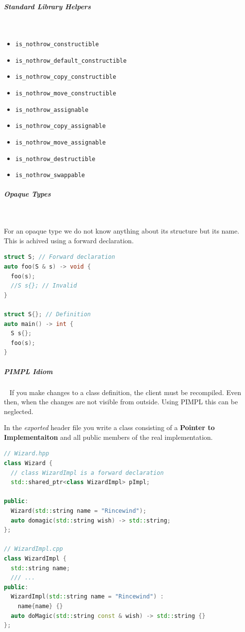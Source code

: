 \documentclass[11pt,twoside,landscape]{article}
\begin{document}
\begin{multicols}{2}
\subparagraph{Standard Library Helpers} \
\label{sec:org117503f}
\begin{itemize}
\item \texttt{is\_nothrow\_constructible}
\item \texttt{is\_nothrow\_default\_constructible}
\item \texttt{is\_nothrow\_copy\_constructible}
\item \texttt{is\_nothrow\_move\_constructible}
\item \texttt{is\_nothrow\_assignable}
\item \texttt{is\_nothrow\_copy\_assignable}
\item \texttt{is\_nothrow\_move\_assignable}
\item \texttt{is\_nothrow\_destructible}
\item \texttt{is\_nothrow\_swappable}
\end{itemize}
\subparagraph{Opaque Types} \
\label{sec:org04ccf2d}

For an opaque type we do not know anything about its structure but its name.
This is achived using a forward declaration.

\begin{lstlisting}[language=c++,label=lst:example-for-an-opaque-type,numbers=none]
struct S; // Forward declaration
auto foo(S & s) -> void {
  foo(s);
  //S s{}; // Invalid
}

struct S{}; // Definition
auto main() -> int {
  S s{};
  foo(s);
}
\end{lstlisting}

\subparagraph{PIMPL Idiom} \
\label{sec:org018cc46}
If you make changes to a class definition, the client must be recompiled.
Even then, when the changes are not visible from outside.
Using PIMPL this can be neglected.

In the \emph{exported} header file you write a class consisting of a \textbf{Pointer to Implementaiton} and all public members of the real implementation.

\begin{lstlisting}[language=c++,caption={PIMPL example using shared\textsubscript{ptr}},captionpos=b,numbers=none]
// Wizard.hpp
class Wizard {
  // class WizardImpl is a forward declaration
  std::shared_ptr<class WizardImpl> pImpl;

public:
  Wizard(std::string name = "Rincewind");
  auto domagic(std::string wish) -> std::string;
};

// WizardImpl.cpp
class WizardImpl {
  std::string name;
  /// ...
public:
  WizardImpl(std::string name = "Rincewind") :
    name{name} {}
  auto doMagic(std::string const & wish) -> std::string {}
};


\end{lstlisting}
\end{multicols}
\end{document}
